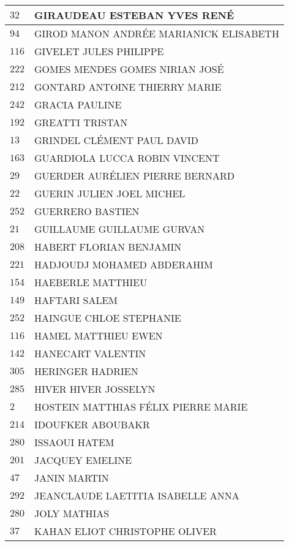 \begin{xltabular}{\linewidth}{|l|X|}
    \hline
    $32$ & GIRAUDEAU ESTEBAN YVES RENÉ \\
    \hline
    $94$ & GIROD MANON ANDRÉE MARIANICK ELISABETH \\
    \hline
    $116$ & GIVELET JULES PHILIPPE \\
    \hline
    $222$ & GOMES MENDES GOMES NIRIAN JOSÉ \\
    \hline
    $212$ & GONTARD ANTOINE THIERRY MARIE \\
    \hline
    $242$ & GRACIA PAULINE \\
    \hline
    $192$ & GREATTI TRISTAN \\
    \hline
    $13$ & GRINDEL CLÉMENT PAUL DAVID \\
    \hline
    $163$ & GUARDIOLA LUCCA ROBIN VINCENT \\
    \hline
    $29$ & GUERDER AURÉLIEN PIERRE BERNARD \\
    \hline
    $22$ & GUERIN JULIEN JOEL MICHEL \\
    \hline
    $252$ & GUERRERO BASTIEN \\
    \hline
    $21$ & GUILLAUME GUILLAUME GURVAN \\
    \hline
    $208$ & HABERT FLORIAN BENJAMIN \\
    \hline
    $221$ & HADJOUDJ MOHAMED ABDERAHIM \\
    \hline
    $154$ & HAEBERLE MATTHIEU \\
    \hline
    $149$ & HAFTARI SALEM \\
    \hline
    $252$ & HAINGUE CHLOE STEPHANIE \\
    \hline
    $116$ & HAMEL MATTHIEU EWEN \\
    \hline
    $142$ & HANECART VALENTIN \\
    \hline
    $305$ & HERINGER HADRIEN \\
    \hline
    $285$ & HIVER HIVER JOSSELYN \\
    \hline
    $2$ & HOSTEIN MATTHIAS FÉLIX PIERRE MARIE \\
    \hline
    $214$ & IDOUFKER ABOUBAKR \\
    \hline
    $280$ & ISSAOUI HATEM \\
    \hline
    $201$ & JACQUEY EMELINE \\
    \hline
    $47$ & JANIN MARTIN \\
    \hline
    $292$ & JEANCLAUDE LAETITIA ISABELLE ANNA \\
    \hline
    $280$ & JOLY MATHIAS \\
    \hline
    $37$ & KAHAN ELIOT CHRISTOPHE OLIVER \\

\end{xltabular}
